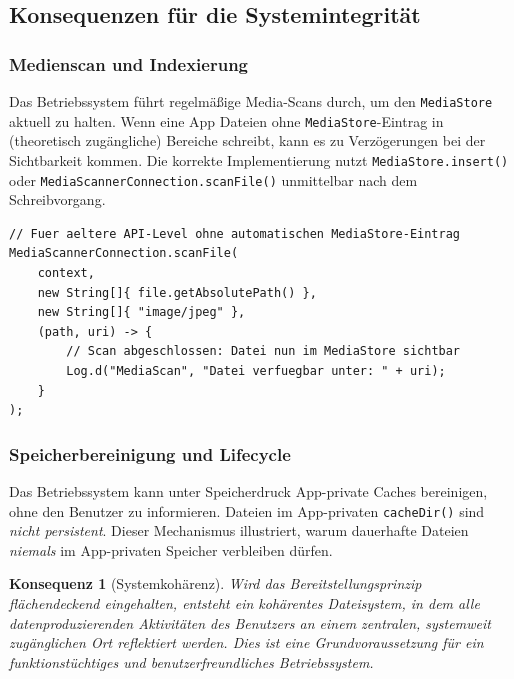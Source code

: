 ﻿\documentclass[12pt, a4paper]{article}
\newtheorem{konsequenz}[definition]{Konsequenz}
\begin{document}
\subsection{Konsequenzen für die Systemintegrität}

\subsubsection{Medienscan und Indexierung}

Das Betriebssystem führt regelmäßige Media-Scans durch, um den \texttt{MediaStore}
aktuell zu halten. Wenn eine App Dateien ohne \texttt{MediaStore}-Eintrag in
(theoretisch zugängliche) Bereiche schreibt, kann es zu Verzögerungen bei der
Sichtbarkeit kommen. Die korrekte Implementierung nutzt \texttt{MediaStore.insert()}
oder \texttt{MediaScannerConnection.scanFile()} unmittelbar nach dem Schreibvorgang.

\begin{lstlisting}[style=android, caption={Expliziter MediaScan (Fallback, Legacy-Code)}]
// Fuer aeltere API-Level ohne automatischen MediaStore-Eintrag
MediaScannerConnection.scanFile(
    context,
    new String[]{ file.getAbsolutePath() },
    new String[]{ "image/jpeg" },
    (path, uri) -> {
        // Scan abgeschlossen: Datei nun im MediaStore sichtbar
        Log.d("MediaScan", "Datei verfuegbar unter: " + uri);
    }
);
\end{lstlisting}

\subsubsection{Speicherbereinigung und Lifecycle}

Das Betriebssystem kann unter Speicherdruck App-private Caches bereinigen,
ohne den Benutzer zu informieren. Dateien im App-privaten \texttt{cacheDir()} sind
\emph{nicht persistent}. Dieser Mechanismus illustriert, warum dauerhafte Dateien
\emph{niemals} im App-privaten Speicher verbleiben dürfen.

\begin{konsequenz}[Systemkohärenz]
Wird das Bereitstellungsprinzip flächendeckend eingehalten, entsteht ein
kohärentes Dateisystem, in dem alle datenproduzierenden Aktivitäten des Benutzers
an einem zentralen, systemweit zugänglichen Ort reflektiert werden. Dies ist
eine Grundvoraussetzung für ein funktionstüchtiges und benutzerfreundliches
Betriebssystem.
\end{konsequenz}
\end{document}
